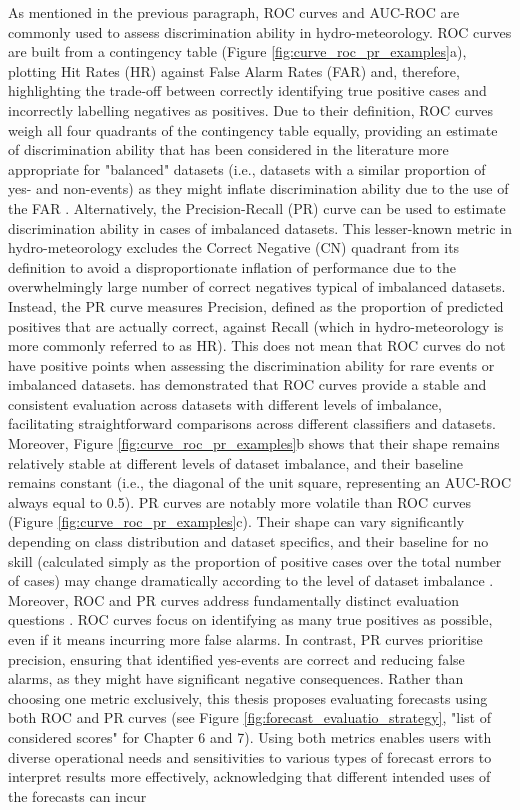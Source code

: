 As  mentioned in the previous paragraph, ROC curves and AUC-ROC are commonly used to assess discrimination ability in hydro-meteorology. ROC curves are built from a contingency table (Figure \ref{fig:curve_roc_pr_examples}a), plotting Hit Rates (HR) against False Alarm Rates (FAR) and, therefore, highlighting the trade-off between correctly identifying true positive cases and incorrectly labelling negatives as positives. Due to their definition, ROC curves weigh all four quadrants of the contingency table equally, providing an estimate of discrimination ability that has been considered in the literature more appropriate for "balanced" datasets (i.e., datasets with a similar proportion of yes- and non-events) as they might inflate discrimination ability due to the use of the FAR \citep{Davis_2006}. Alternatively, the Precision-Recall (PR) curve can be used to estimate discrimination ability in cases of imbalanced datasets. This lesser-known metric in hydro-meteorology excludes the Correct Negative (CN) quadrant from its definition to avoid a disproportionate inflation of performance due to the overwhelmingly large number of correct negatives typical of imbalanced datasets. Instead, the PR curve measures Precision, defined as the proportion of predicted positives that are actually correct, against Recall (which in hydro-meteorology is more commonly referred to as HR). This does not mean that ROC curves do not have positive points when assessing the discrimination ability for rare events or imbalanced datasets. \citet{Richardson_2024} has demonstrated that ROC curves provide a stable and consistent evaluation across datasets with different levels of imbalance, facilitating straightforward comparisons across different classifiers and datasets. Moreover, Figure \ref{fig:curve_roc_pr_examples}b shows that their shape remains relatively stable at different levels of dataset imbalance, and their baseline remains constant (i.e., the diagonal of the unit square, representing an AUC-ROC always equal to 0.5). PR curves are notably more volatile than ROC curves (Figure \ref{fig:curve_roc_pr_examples}c). Their shape can vary significantly depending on class distribution and dataset specifics, and their baseline for no skill (calculated simply as the proportion of positive cases over the total number of cases) may change dramatically according to the level of dataset imbalance \cite{Richardson_2024}. Moreover, ROC and PR curves address fundamentally distinct evaluation questions \cite{Cook_2020}. ROC curves focus on identifying as many true positives as possible, even if it means incurring more false alarms. In contrast, PR curves prioritise precision, ensuring that identified yes-events are correct and reducing false alarms, as they might have significant negative consequences. Rather than choosing one metric exclusively, this thesis proposes evaluating forecasts using both ROC and PR curves (see Figure \ref{fig:forecast_evaluatio_strategy}, "list of considered scores" for Chapter 6 and 7). Using both metrics enables users with diverse operational needs and sensitivities to various types of forecast errors to interpret results more effectively, acknowledging that different intended uses of the forecasts can incur 